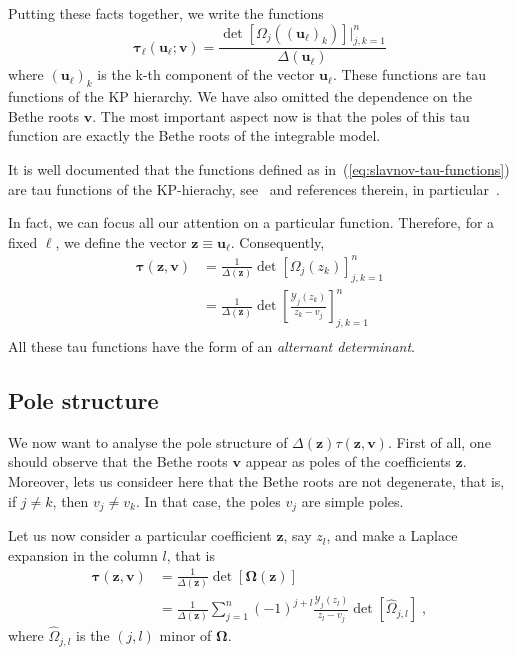 \documentclass[a4paper,11pt]{amsart}
\begin{document}
Putting these facts together, we write the functions
\begin{equation}
\label{eq:slavnov-tau-functions}
  \bm{\tau}_\ell(\bm{u}_\ell; \bm{v}) = \frac{\det [\Omega_j((\bm{u}_\ell)_k)]|_{j,k=1}^n }{\Delta(\bm{u}_\ell)} 
\end{equation}
where \((\bm{u}_\ell)_k \) is the k-th component of the vector
\(\bm{u}_\ell\). These functions are tau functions of the KP
hierarchy.  We have also omitted the dependence on the Bethe roots
\(\bm{v}\). The most important aspect now is that the poles of this
tau function are exactly the Bethe roots of the integrable model.

It is well documented that the functions defined as
in~(\ref{eq:slavnov-tau-functions}) are tau functions of the
KP-hierachy, see~\cite{Araujo:2021ghu} and references therein, in
particular~\cite{Kharchev:1991cy}.

In fact, we can focus all our attention on a particular function. Therefore,
for a fixed \(\ell\), we define the vector \( \bm{z} \equiv \bm{u}_\ell\).
Consequently, 
\begin{equation}
\begin{split}
\label{eq:tau-function}
  \bm{\tau}(\bm{z}, \bm{v})
  & = \frac{1}{\Delta(\bm{z})} \det[\Omega_j(z_k) ]_{j,k=1}^n \\
  & = \frac{1}{\Delta(\bm{z})} \det\left[\frac{\mathcal{Y}_j(z_k)}{z_k - v_j} \right]_{j,k=1}^n  \\
\end{split}
\end{equation}
All these tau functions have the form of an
\emph{alternant determinant}.

\subsection{Pole structure}

We now want to analyse the pole structure of
\(\Delta(\bm{z})\tau(\bm{z}, \bm{v})\).  First of all, one should
observe that the Bethe roots \(\bm{v}\) appear as poles of the
coefficients \(\bm{z}\). Moreover, lets us consideer here that the
Bethe roots are not degenerate, that is, if \(j \neq k\), then \(v_j
\neq v_k\). In that case, the poles \(v_j\) are simple poles.

Let us now consider a particular coefficient \(\bm{z}\), say \(z_l\), and
make a Laplace expansion in the column \(l\), that is
\begin{equation}
\begin{split}
  \bm{\tau}(\bm{z}, \bm{v})
  & = \frac{1}{\Delta(\bm{z})} \det[\bm{\Omega}(\bm{z}) ] \\
  & = \frac{1}{\Delta(\bm{z})} \sum_{j=1}^n (-1)^{j + l} \frac{\mathcal{Y}_j(z_l)}{z_l - v_j  } 
  \det[\hat{\Omega}_{j, l}]\; ,
\end{split}
\end{equation}
where \(\hat{\Omega}_{j,l} \) is the \((j, l)\) minor of \(\bm{\Omega}\).
\end{document}
